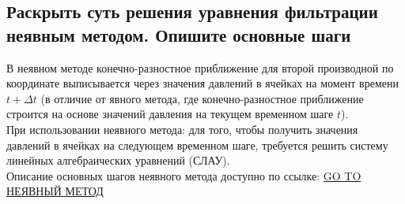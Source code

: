 

\subsection{Раскрыть суть решения уравнения фильтрации неявным методом. Опишите основные шаги}

В неявном методе конечно-разностное приближение для второй производной по координате выписывается через значения давлений в ячейках на момент времени $t+\Delta t$ (в отличие от явного метода, где конечно-разностное приближение строится на основе значений давления на текущем временном шаге $t$).
\\

При использовании неявного метода: для того, чтобы получить значения давлений в ячейках на следующем временном шаге, требуется решить систему линейных алгебраических уравнений (СЛАУ).
\\

Описание основных шагов неявного метода доступно по ссылке: \href{https://docs.yandex.ru/docs/view?url=ya-disk-public\%3A\%2F\%2FWicxck3PRHBvGgXBKaNry\%2FRtiluR1m6cR6Bi14xdyyNQDBM0D9VXsHr3EpLffWemDqZvSgIch5AN9ddz7ydViQ\%3D\%3D\%3A\%2F\%D0\%92\%D1\%82\%D0\%BE\%D1\%80\%D0\%BE\%D0\%B9\%20\%D0\%BA\%D1\%83\%D1\%80\%D1\%81\%20\%D0\%BC\%D0\%B0\%D0\%B3\%D0\%B8\%D1\%81\%D1\%82\%D1\%80\%D0\%B0\%D1\%82\%D1\%83\%D1\%80\%D1\%8B\%2F\%D0\%93\%D0\%B8\%D0\%B4\%D1\%80\%D0\%BE\%D0\%B4\%D0\%B8\%D0\%BD\%D0\%B0\%D0\%BC\%D0\%B8\%D1\%87\%D0\%B5\%D1\%81\%D0\%BA\%D0\%BE\%D0\%B5\%20\%D0\%BC\%D0\%BE\%D0\%B4\%D0\%B5\%D0\%BB\%D0\%B8\%D1\%80\%D0\%BE\%D0\%B2\%D0\%B0\%D0\%BD\%D0\%B8\%D0\%B5\%2F\%D0\%97\%D0\%B0\%D0\%B4\%D0\%B0\%D0\%BD\%D0\%B8\%D1\%8F\%2F\%D0\%9D\%D0\%B5\%D0\%B2\%D0\%BD\%D0\%BE\%D0\%B5_\%D1\%80\%D0\%B5\%D1\%88\%D0\%B5\%D0\%BD\%D0\%B8\%D0\%B5_\%D1\%83\%D1\%80\%D0\%B0\%D0\%B2\%D0\%BD\%D0\%B5\%D0\%BD\%D0\%B8\%D1\%8F_\%D1\%84\%D0\%B8\%D0\%BB\%D1\%8C\%D1\%82\%D1\%80\%D0\%B0\%D1\%86\%D0\%B8\%D0\%B8.pdf&name=\%D0\%9D\%D0\%B5\%D0\%B2\%D0\%BD\%D0\%BE\%D0\%B5_\%D1\%80\%D0\%B5\%D1\%88\%D0\%B5\%D0\%BD\%D0\%B8\%D0\%B5_\%D1\%83\%D1\%80\%D0\%B0\%D0\%B2\%D0\%BD\%D0\%B5\%D0\%BD\%D0\%B8\%D1\%8F_\%D1\%84\%D0\%B8\%D0\%BB\%D1\%8C\%D1\%82\%D1\%80\%D0\%B0\%D1\%86\%D0\%B8\%D0\%B8.pdf}{GO TO НЕЯВНЫЙ МЕТОД}

